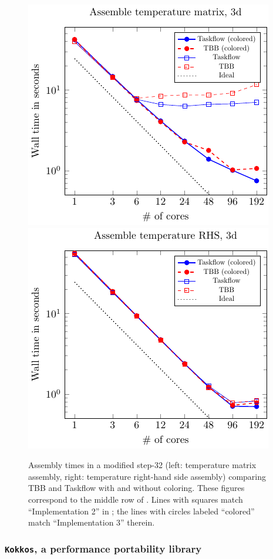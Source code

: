 \documentclass{ansarticle-preprint}
\newcommand{\specialword}[1]{\texttt{#1}}
\newcommand{\kokkos}{{\specialword{Kokkos}}\xspace}
\begin{document}
\begin{figure}[tb]
\includegraphics{taskflow-vs-tbb/plots-figure1.pdf}\hfill
\includegraphics{taskflow-vs-tbb/plots-figure2.pdf}
\caption{Assembly times in a modified step-32 (left: temperature
  matrix assembly, right: temperature right-hand side assembly)
  comparing TBB and Taskflow with and without coloring. These figures
  correspond to the middle row of \cite[Fig. 4]{TKB16}. Lines with
  squares match ``Implementation 2'' in \cite{TKB16}; the lines with
  circles labeled ``colored'' match ``Implementation 3'' therein.}
\label{fig:tbb-vs-taskflow}
\end{figure}


\subsubsection{\kokkos, a performance portability library}
\label{subsec:external-kokkos}
\end{document}
